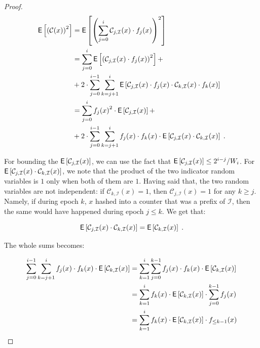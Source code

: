 \documentclass[sigconf]{acmart}
\begin{document}
\begin{proof}
\begin{align*}
\mathsf{E}\left[ \left(\mathcal{C}(x)\right)^2 \right] &= \mathsf{E}\left[ \left( \sum_{j=0}^i   \mathcal{C}_{j,\mathcal{I}}(x) \cdot f_j(x)    \right)^2 \right]\\
&=\sum_{j=0}^i   \mathsf{E}\left[  \left( \mathcal{C}_{j,\mathcal{I}}(x) \cdot f_j(x) \right)^2 \right] +\\
&+ 2\cdot \sum_{j=0}^{i-1}  \sum_{k=j+1}^i   \mathsf{E}\left[  \mathcal{C}_{j,\mathcal{I}}(x) \cdot f_j(x) \cdot  \mathcal{C}_{k,\mathcal{I}}(x) \cdot f_k(x)  \right] \\
&= \sum_{j=0}^i    {f_j(x) }^2 \cdot \mathsf{E}\left[  \mathcal{C}_{j,\mathcal{I}}(x) \right] +\\
&+  2\cdot \sum_{j=0}^{i-1}  \sum_{k=j+1}^i   f_j(x)  \cdot f_k(x) \cdot   \mathsf{E}\left[  \mathcal{C}_{j,\mathcal{I}}(x) \cdot   \mathcal{C}_{k,\mathcal{I}}(x)  \right] \;.
\end{align*}

For bounding the $\mathsf{E}\left[  \mathcal{C}_{j,\mathcal{I}}(x) \right]$, we can use the fact that $\mathsf{E}\left[  \mathcal{C}_{j,\mathcal{I}}(x) \right]  \leq 2^{i-j}/W_i$. For   $\mathsf{E}\left[  \mathcal{C}_{j,\mathcal{I}}(x) \cdot   \mathcal{C}_{k,\mathcal{I}}(x)  \right]$, we note that the product of the two indicator random variables is $1$ only when both of them are $1$. Having said that, the two random variables are not independent: if $\mathcal{C}_{k,\mathcal{I}}(x) =1$, then $ \mathcal{C}_{j,\mathcal{I}}(x)=1$ for any $k\geq j$. Namely, if during epoch $k$, $x$ hashed into a counter that was a prefix of $\mathcal{I}$, then the same would have happened during epoch $j \leq k$.  We get that:

$$\mathsf{E}\left[  \mathcal{C}_{j,\mathcal{I}}(x) \cdot   \mathcal{C}_{k,\mathcal{I}}(x)  \right] = \mathsf{E}\left[   \mathcal{C}_{k,\mathcal{I}}(x)  \right] \;.$$

\noindent
The whole sums becomes:

\begin{align*}
\sum_{j=0}^{i-1}  \sum_{k=j+1}^i   f_j(x)  \cdot f_k(x) \cdot   \mathsf{E}\left[  \mathcal{C}_{k,\mathcal{I}}(x)  \right] &= \sum_{k=1}^i \sum_{j=0}^{k-1}  f_j(x)  \cdot f_k(x) \cdot   \mathsf{E}\left[  \mathcal{C}_{k,\mathcal{I}}(x)  \right]\\
&= \sum_{k=1}^i   f_k(x) \cdot   \mathsf{E}\left[  \mathcal{C}_{k,\mathcal{I}}(x)  \right] \cdot \sum_{j=0}^{k-1}  f_j(x)\\
&=  \sum_{k=1}^i   f_k(x) \cdot   \mathsf{E}\left[  \mathcal{C}_{k,\mathcal{I}}(x)  \right] \cdot f_{\leq k-1}(x)
\end{align*}


\end{proof}
\end{document}
